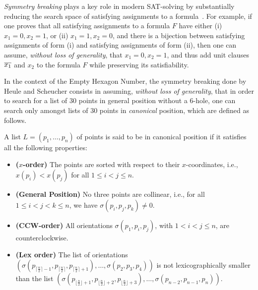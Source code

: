 \emph{Symmetry breaking} plays a key role in modern SAT-solving by substantially reducing the search space of satisfying assignments to a formula~\cite{biereHandbookSatisfiabilityVolume2009}. For example, if one proves that all satisfying assignments to a formula $F$ have either (i) $x_1 = 0, x_2 = 1$, or  (ii) $x_1 = 1, x_2 = 0$, and there is a bijection between satisfying assignments of form (i) and satisfying assignments of form (ii), then one can assume, \emph{without loss of generality}, that $x_1 = 0, x_2 = 1$, and thus add unit clauses $\overline{x_1}$ and $x_2$ to the formula $F$ while preserving its satisfiability.

In the context of the Empty Hexagon Number, the symmetry breaking done by Heule and Scheucher consists in assuming, \emph{without loss of generality}, that in order to search for a list of $30$ points in general position without a $6$-hole, one can search only amongst lists of $30$ points in \emph{canonical} position, which are defined as follows.
\begin{definition}
A list $L = (p_1,\ldots, p_{n})$ of points is said to be in canonical position if it satisfies all the following properties:
\begin{itemize}
    \item \textbf{($x$-order)} The points are sorted with respect to their $x$-coordinates, i.e., $x(p_i) < x(p_j)$ for all $1 \leq i < j \leq n$.
    \item \textbf{(General Position)} No three points are collinear, i.e., for all $1 \leq i < j < k \leq n$, we have $\sigma(p_i, p_j, p_k) \neq 0$.
    \item \textbf{(CCW-order)} All orientations $\sigma(p_1, p_i, p_j)$, with $1 < i < j \leq n$, are counterclockwise.
    \item \textbf{(Lex order)} The list of orientations \( \left(\sigma\left(p_{\lceil \frac{n}{2} \rceil -1}, p_{\lceil \frac{n}{2} \rceil},p_{\lceil \frac{n}{2} \rceil+1}\right), \ldots, \sigma\left(p_2, p_3, p_4\right) \right)\) is not lexicographically smaller than the list \(\left(\sigma\left(p_{\lfloor \frac{n}{2} \rfloor  + 1}, p_{\lfloor \frac{n}{2} \rfloor+2},p_{\lfloor \frac{n}{2} \rfloor+3}\right), \ldots, \sigma\left(p_{n-2}, p_{n-1}, p_{n}\right) \right).\)
\end{itemize}
\end{definition}

